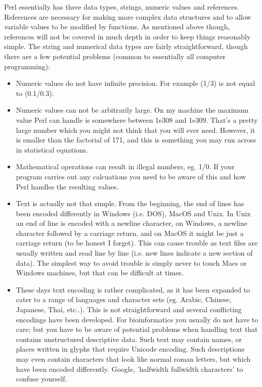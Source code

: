 \documentclass[11pt]{article}
\begin{document}
Perl essentially has three data types, strings, numeric values and
references. References are necessary for making more complex data
structures and to allow variable values to be modified by functions. As
mentioned above though, references will not be covered in much depth in
order to keep things reasonably simple. The string and
numerical data types are fairly straightforward, though there are a few
potential problems (common to essentially all computer programming):

\begin{itemize}
\item Numeric values do not have infinite precision. For example (1/3) is
not equal to (0.1/0.3).

\item Numeric values can not be arbitrarily large. On my machine the
maximum value Perl can handle is somewhere between 1e308 and
1e309. That's a pretty large number which you might not think that
you will ever need.  However, it is smaller than the factorial of
171, and this is something you may run across in statistical
equations.

\item Mathematical operations can result in illegal numbers, eg. 1/0. If
your program carries out any calcuations you need to be aware of
this and how Perl handles the resulting values.

\item Text is actually not that simple. From the beginning, the end of
lines has been encoded differently in Windows (i.e. DOS), MacOS and
Unix. In Unix an end of line is encoded with a newline character, on
Windows, a newline character followed by a carriage return, and on
MacOS it might be just a carriage return (to be honest I
forget). This can cause trouble as text files are usually written
and read line by line (i.e.  new lines indicate a new section of
data). The simplest way to avoid trouble is simply never to touch
Macs or Windows machines, but that can be difficult at times.

\item These days text encoding is rather complicated, as it has been
expanded to cater to a range of languages and character sets
(eg. Arabic, Chinese, Japanese, Thai, etc..). This is not
straightforward and several conflicting encodings have been
developed. For bioinformatics you usually do not have to care; but
you have to be aware of potential problems when handling text that
contains unstructured descriptive data. Such text may contain
names, or places written in glyphs that require Unicode
encoding. Such descriptions may even contain characters that look
like normal roman letters, but which have been encoded differently.
Google, 'halfwidth fullwidth characters' to confuse yourself.


\end{itemize}
\end{document}
